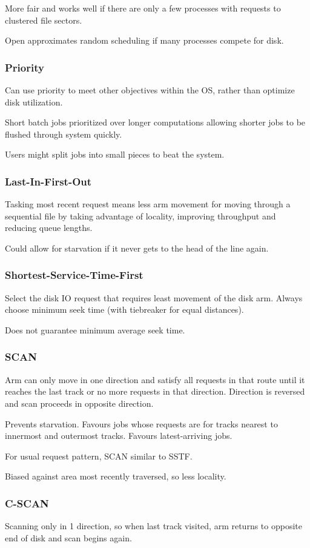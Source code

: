 \documentclass[11pt]{article}
\begin{document}
More fair and works well if there are only a few processes with requests to clustered
file sectors.

Open approximates random scheduling if many processes compete for disk.
\subsubsection{Priority}
\label{sec:org75eeb2a}
Can use priority to meet other objectives within the OS, rather than optimize disk
utilization.

Short batch jobs prioritized over longer computations allowing shorter jobs to be
flushed through system quickly.

Users might split jobs into small pieces to beat the system.
\subsubsection{Last-In-First-Out}
\label{sec:org93b3499}
Tasking most recent request means less arm movement for moving through a sequential
file by taking advantage of locality, improving throughput and reducing queue lengths.

Could allow for starvation if it never gets to the head of the line again.
\subsubsection{Shortest-Service-Time-First}
\label{sec:orgf0ce954}
Select the disk IO request that requires least movement of the disk arm.
Always choose minimum seek time (with tiebreaker for equal distances).

Does not guarantee minimum average seek time.
\subsubsection{SCAN}
\label{sec:org394f9d3}
Arm can only move in one direction and satisfy all requests in that route until it
reaches the last track or no more requests in that direction.
Direction is reversed and scan proceeds in opposite direction.

Prevents starvation.
Favours jobs whose requests are for tracks nearest to innermost and outermost tracks.
Favours latest-arriving jobs.

For usual request pattern, SCAN similar to SSTF.

Biased against area most recently traversed, so less locality.
\subsubsection{C-SCAN}
\label{sec:org18cb9ba}
Scanning only in 1 direction, so when last track visited, arm returns to opposite end of
disk and scan begins again.
\end{document}

